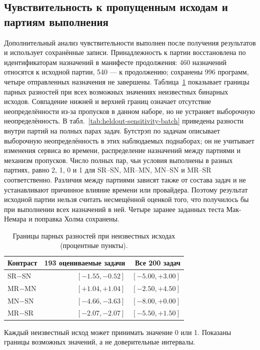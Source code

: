 \subsection*{Чувствительность к пропущенным исходам и партиям выполнения}
Дополнительный анализ чувствительности выполнен после получения результатов и использует сохранённые записи. Принадлежность к партии восстановлена по идентификаторам назначений в манифесте продолжения: 460 назначений относятся к исходной партии, 540 --- к продолжению; сохранены 996 программ, четыре отправленных назначения не завершены. Таблица~\ref{tab:heldout-sensitivity-bounds} показывает границы парных разностей при всех возможных значениях неизвестных бинарных исходов. Совпадение нижней и верхней границ означает отсутствие неопределённости из-за пропусков в данном наборе, но не устраняет выборочную неопределённость. В табл.~\ref{tab:heldout-sensitivity-batch} приведены разности внутри партий на полных парах задач. Бутстрэп по задачам описывает выборочную неопределённость в этих наблюдаемых поднаборах; он не учитывает изменения сервиса во времени, распределение назначений между партиями и механизм пропусков. Число полных пар, чьи условия выполнены в разных партиях, равно 2, 1, 0 и 1 для SR--SN, MR--MN, MN--SN и MR--SR соответственно. Различия между партиями зависят также от состава задач и не устанавливают причинное влияние времени или провайдера. Поэтому результат исходной партии нельзя считать несмещённой оценкой того, что получилось бы при выполнении всех назначений в ней. Четыре заранее заданных теста Мак-Немара и поправка Холма сохранены.

\begin{table}[!htbp]\centering\small
\caption{Границы парных разностей при неизвестных исходах (процентные пункты).}\label{tab:heldout-sensitivity-bounds}
\begin{tabular*}{\textwidth}{@{\extracolsep{\fill}}lrr}\toprule
Контраст & 193 оцениваемые задачи & Все 200 задач \\ \midrule
SR$-$SN & $[-1.55,-0.52]$ & $[-5.00,+3.00]$ \\
MR$-$MN & $[+1.04,+1.04]$ & $[-2.50,+4.50]$ \\
MN$-$SN & $[-4.66,-3.63]$ & $[-8.00,+0.00]$ \\
MR$-$SR & $[-2.07,-2.07]$ & $[-5.50,+1.50]$ \\
\bottomrule\end{tabular*}\par\smallskip\footnotesize Каждый неизвестный исход может принимать значение 0 или 1. Показаны границы возможных значений, а не доверительные интервалы.\end{table}

